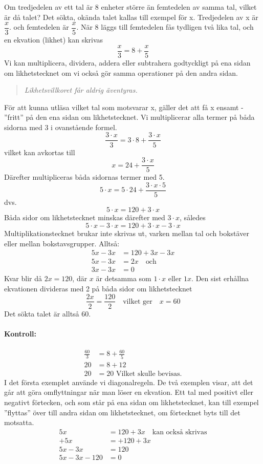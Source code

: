 Om tredjedelen av ett tal är 8 enheter större än femtedelen av samma tal, vilket
är då talet?
Det sökta, okända talet kallas till exempel för x.
Tredjedelen av x är \(\dfrac{x}{3}\). och femtedelen är \(\dfrac{x}{5}\).
När 8 läggs till femtedelen fås tydligen två lika tal, och en ekvation (likhet)
kan skrivas
\[\dfrac{x}{3}=8 + \dfrac{x}{5}\]
Vi kan multiplicera, dividera, addera eller subtrahera godtyckligt på ena sidan
om likhetstecknet om vi också gör samma operationer på den andra sidan.

\begin{quote}\emph{
Likhetsvillkoret får aldrig äventyras.
}\end{quote}

För att kunna utläsa vilket tal som motsvarar x, gäller det att få x ensamt -
''fritt'' på den ena sidan om likhetstecknet.
Vi multiplicerar alla termer på båda sidorna med 3 i ovanstående formel.
\[\frac{3 \cdot x}{3} = 3 \cdot 8 + \frac{3 \cdot x}{5}\]
vilket kan avkortas till
\[x = 24 + \frac{3 \cdot x}{5}\]
Därefter multipliceras båda sidornas termer med 5.
\[5 \cdot x = 5 \cdot 24 + \frac{3 \cdot x \cdot 5}{5}\]
dvs.
\[5 \cdot x = 120 + 3 \cdot x\]
Båda sidor om likhetstecknet minskas därefter med \(3 \cdot x\), således
\[5 \cdot x - 3 \cdot x = 120 + 3 \cdot x - 3 \cdot x\]
Multiplikationstecknet brukar inte skrivas ut, varken mellan tal och bokstäver
eller mellan bokstavsgrupper.
Alltså:
\begin{align*}
5x - 3x &= 120 + 3x - 3x \\
5x - 3x &= 2x \quad \text{och} \\
3x - 3x &= 0
\end{align*}
Kvar blir då \(2x = 120\), där \(x\) är detsamma som \(1 \cdot x\) eller \(1x\).
Den sist erhållna ekvationen divideras med 2 på båda sidor om likhetstecknet
\[
\frac{2x}{2} = \frac{120}{2}
\quad \text{vilket ger} \quad
x = 60
\]
Det sökta talet är alltså 60.

\paragraph{Kontroll:}

\begin{align*}
\frac{60}{3} & = 8 + \frac{60}{5}\\
          20 &= 8 + 12 \\
          20 &= 20\text{ Vilket skulle bevisas.}
\end{align*}
I det första exemplet använde vi diagonalregeln.
De två exemplen visar, att det går att göra omflyttningar när man löser en
ekvation.
Ett tal med positivt eller negativt förtecken, och som står på ena sidan om
likhetstecknet, kan till exempel ''flyttas'' över till andra sidan om likhetstecknet,
om förtecknet byts till det motsatta.
\begin{align*}
  5x &= 120 + 3x \quad \text{kan också skrivas} \\
  +5x &= +120+ 3x \\
  5x-3x &= 120 \\
  5x- 3x-120 &= 0 \\
\end{align*}

